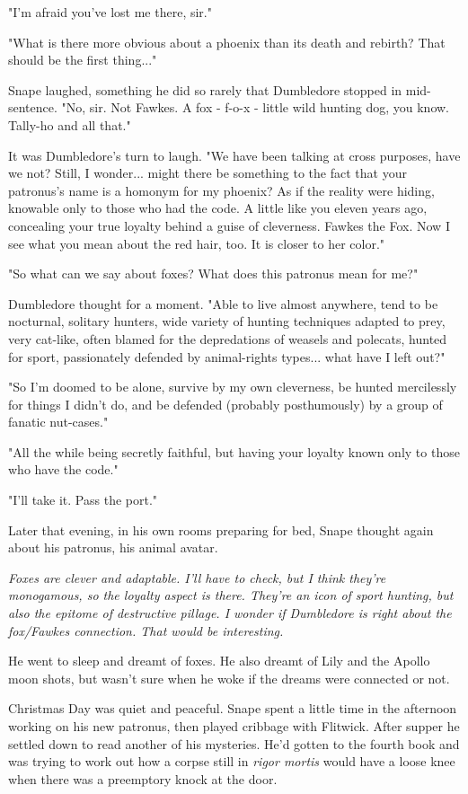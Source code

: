 \documentclass[a4paper,11pt]{article}
\begin{document}
"I'm afraid you've lost me there, sir."

"What is there more obvious about a phoenix than its death and rebirth? That should be the first thing..."

Snape laughed, something he did so rarely that Dumbledore stopped in mid-sentence. "No, sir. Not Fawkes. A fox - f-o-x - little wild hunting dog, you know. Tally-ho and all that."

It was Dumbledore's turn to laugh. "We have been talking at cross purposes, have we not? Still, I wonder... might there be something to the fact that your patronus's name is a homonym for my phoenix? As if the reality were hiding, knowable only to those who had the code. A little like you eleven years ago, concealing your true loyalty behind a guise of cleverness. Fawkes the Fox. Now I see what you mean about the red hair, too. It is closer to her color."

"So what can we say about foxes? What does this patronus mean for me?"

Dumbledore thought for a moment. "Able to live almost anywhere, tend to be nocturnal, solitary hunters, wide variety of hunting techniques adapted to prey, very cat-like, often blamed for the depredations of weasels and polecats, hunted for sport, passionately defended by animal-rights types... what have I left out?"

"So I'm doomed to be alone, survive by my own cleverness, be hunted mercilessly for things I didn't do, and be defended (probably posthumously) by a group of fanatic nut-cases."

"All the while being secretly faithful, but having your loyalty known only to those who have the code."

"I'll take it. Pass the port."

Later that evening, in his own rooms preparing for bed, Snape thought again about his patronus, his animal avatar.

\emph{Foxes are clever and adaptable. I'll have to check, but I think they're monogamous, so the loyalty aspect is there. They're an icon of sport hunting, but also the epitome of destructive pillage. I wonder if Dumbledore is right about the fox/Fawkes connection. That would be interesting.}

He went to sleep and dreamt of foxes. He also dreamt of Lily and the Apollo moon shots, but wasn't sure when he woke if the dreams were connected or not.

Christmas Day was quiet and peaceful. Snape spent a little time in the afternoon working on his new patronus, then played cribbage with Flitwick. After supper he settled down to read another of his mysteries. He'd gotten to the fourth book and was trying to work out how a corpse still in \emph{rigor mortis} would have a loose knee when there was a preemptory knock at the door.
\end{document}
